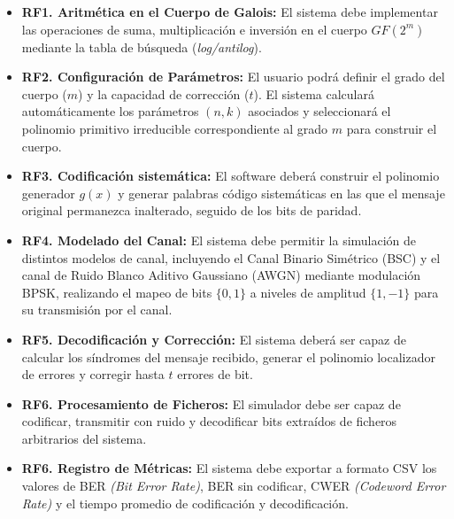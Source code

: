 \begin{itemize}

    \item \textbf{RF1. Aritmética en el Cuerpo de Galois:} El sistema debe implementar las operaciones de suma, multiplicación e inversión en el cuerpo $GF(2^m)$ mediante la tabla de búsqueda (\textit{log/antilog}).
    
    \item \textbf{RF2. Configuración de Parámetros:} El usuario podrá definir el grado del cuerpo ($m$) y la capacidad de corrección ($t$). El sistema calculará automáticamente los parámetros $(n,k)$ asociados y seleccionará el polinomio primitivo irreducible correspondiente al grado $m$ para construir el cuerpo.
    
    \item \textbf{RF3. Codificación sistemática:} El software deberá construir el polinomio generador $g(x)$ y generar palabras código sistemáticas en las que el mensaje original permanezca inalterado, seguido de los bits de paridad.
    
    \item \textbf{RF4. Modelado del Canal:} El sistema debe permitir la simulación de distintos modelos de canal, incluyendo el Canal Binario Simétrico (BSC) y el canal de Ruido Blanco Aditivo Gaussiano (AWGN) mediante modulación BPSK, realizando el mapeo de bits $\{0, 1\}$ a niveles de amplitud $\{1, -1\}$ para su transmisión por el canal.
    
    \item \textbf{RF5. Decodificación y Corrección:} El sistema deberá ser capaz de calcular los síndromes del mensaje recibido, generar el polinomio localizador de errores y corregir hasta $t$ errores de bit.

    \item \textbf{RF6. Procesamiento de Ficheros:} El simulador debe ser capaz de codificar, transmitir con ruido y decodificar bits extraídos de ficheros arbitrarios del sistema.
    
    \item \textbf{RF6. Registro de Métricas:} El sistema debe exportar a formato CSV los valores de BER \textit{(Bit Error Rate)}, BER sin codificar, CWER \textit{(Codeword Error Rate)} y el tiempo promedio de codificación y decodificación.
    
\end{itemize}

